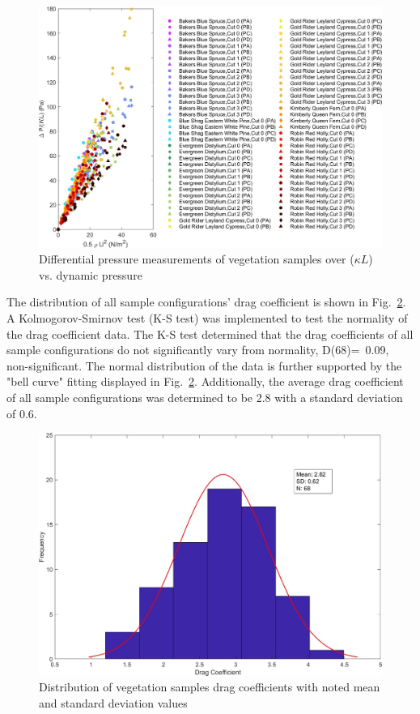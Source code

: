 \documentclass[12pt]{article}
\begin{document}
\begin{figure}
	\centering
	\includegraphics[width=\textwidth,keepaspectratio]{Picture9.jpg}
	\caption{Differential pressure measurements of vegetation samples over ($\kappa L$) vs. dynamic pressure}
	\label{fig:DPoveraf(Overall)}
\end{figure}

The distribution of all sample configurations' drag coefficient is shown in Fig.~\ref{fig:Histogram}. A Kolmogorov-Smirnov test  (K-S test) was implemented to test the normality of the drag coefficient data. The K-S test determined that the drag coefficients of all sample configurations do not significantly vary from normality, D(68)=~0.09, non-significant. The normal distribution of the data is further supported by the "bell curve" fitting displayed in  Fig.~\ref{fig:Histogram}. Additionally, the average drag coefficient of all sample configurations was determined to be 2.8 with a standard deviation of 0.6.

\begin{figure}[!h]
\includegraphics[width=\textwidth,keepaspectratio]{Picture11.jpg}
	\caption[Distribution of drag coefficients]{Distribution of vegetation samples drag coefficients with noted mean and standard deviation values}
	\label{fig:Histogram}
\end{figure}
\end{document}
